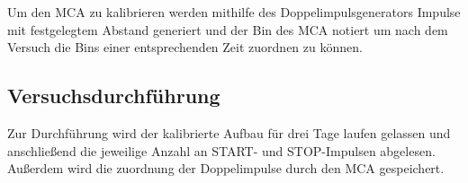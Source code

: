 Um den MCA zu kalibrieren werden mithilfe des Doppelimpulsgenerators Impulse mit festgelegtem Abstand generiert und der Bin des MCA notiert um nach dem Versuch die Bins einer entsprechenden Zeit zuordnen zu können.

\subsection{Versuchsdurchführung}
Zur Durchführung wird der kalibrierte Aufbau für drei Tage laufen gelassen und anschließend die jeweilige Anzahl an START- und STOP-Impulsen abgelesen.
Außerdem wird die zuordnung der Doppelimpulse durch den MCA gespeichert.